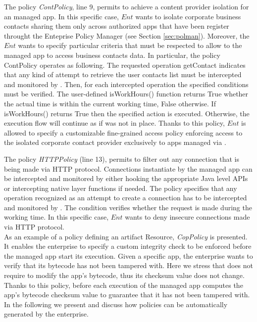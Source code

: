 The policy \textit{ContPolicy}, line 9,  permits to achieve a content provider isolation for an \asd managed app. In this specific case, $Ent$ wants to isolate corporate business contacts sharing them only across authorized apps that have been register throught the \asd Enteprise Policy Manager (see Section \ref{sec:polman}). Moreover, the $Ent$ wants to specify particular criteria that must be respected to allow to the managed app to access business contacts data. In particular, the policy ContPolicy operates as following. The requested operation getContact indicates that any kind of attempt to retrieve the user contacts list must be intercepted and monitored by \asd. Then, for each intercepted operation the specified conditions must be verified. The user-defined isWorkHours() function returns True whether the actual time is within the current working time, False otherwise. If isWorkHours() returns True then the specified action is executed. Otherwise, the execution flow will continue as if \asd was not in place. Thanks to this policy, $Ent$ is allowed to specify a customizable fine-grained access policy enforcing access to the isolated corporate contact provider exclusively to apps managed via \asd.


The policy \textit{HTTPPolicy} (line 13), permits to filter out any connection that is being made via HTTP protocol. Connections instantiate by the managed app can be intercepted and monitored by either hooking the appropriate Java level APIs or intercepting native layer functions if needed. The policy specifies that any operation recognized as an attempt to create a connection has to be intercepted and monitored by \asd. The condition verifies whether the request is made during the working time. In this specific case, $Ent$ wants to deny insecure connections made via HTTP protocol. \\

As an example of a policy defining an artifact Resource, \textit{CopPolicy} is presented. It enables the enterprise to specify a custom integrity check to be enforced before the managed app start its execution. Given a specific app, the enterprise wants to verify that its bytecode has not been tampered with. Here we stress that \asd does not require to modify the app's bytecode, thus its checksum value does not change. Thanks to this policy, before each execution of the managed app \asd
computes the app's bytecode checksum value to guarantee that it has not been tampered with. \\
In the following we present and discuss how \asd policies can be automatically generated by the enterprise.


